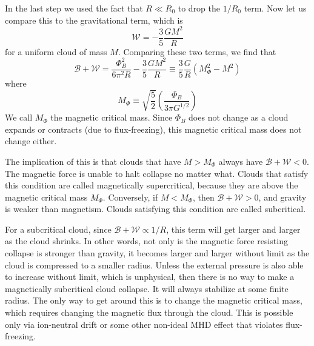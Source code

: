 In the last step we used the fact that $R \ll R_0$ to drop the $1/R_0$ term. Now let us compare this to the gravitational term, which is
\begin{equation}
\mathcal{W} = -\frac{3}{5} \frac{GM^2}{R}
\end{equation}
for a uniform cloud of mass $M$. Comparing these two terms, we find that
\begin{equation}
\mathcal{B}+\mathcal{W} = \frac{\Phi_B^2}{6\pi^2 R} - \frac{3}{5} \frac{GM^2}{R} \equiv \frac{3}{5}\frac{G}{R} \left(M_{\Phi}^2-M^2\right)
\end{equation}
where
\begin{equation}
\label{eq:mphi}
M_{\Phi} \equiv \sqrt{\frac{5}{2}} \left(\frac{\Phi_B}{3 \pi G^{1/2}}\right)
\end{equation}
We call $M_{\Phi}$ the magnetic critical mass. Since $\Phi_B$ does not change as a cloud expands or contracts (due to flux-freezing), this magnetic critical mass does not change either.

The implication of this is that clouds that have $M>M_{\Phi}$ always have $\mathcal{B}+\mathcal{W} < 0$. The magnetic force is unable to halt collapse no matter what. Clouds that satisfy this condition are called magnetically supercritical, because they are above the magnetic critical mass $M_{\Phi}$. Conversely, if $M<M_{\Phi}$, then $\mathcal{B}+\mathcal{W} > 0$, and gravity is weaker than magnetism. Clouds satisfying this condition are called subcritical.

For a subcritical cloud, since $\mathcal{B}+\mathcal{W} \propto 1/R$, this term will get larger and larger as the cloud shrinks. In other words, not only is the magnetic force resisting collapse is stronger than gravity, it becomes larger and larger without limit as the cloud is compressed to a smaller radius. Unless the external pressure is also able to increase without limit, which is unphysical, then there is no way to make a magnetically subcritical cloud collapse. It will always stabilize at some finite radius. The only way to get around this is to change the magnetic critical mass, which requires changing the magnetic flux through the cloud. This is possible only via ion-neutral drift or some other non-ideal MHD effect that violates flux-freezing.


